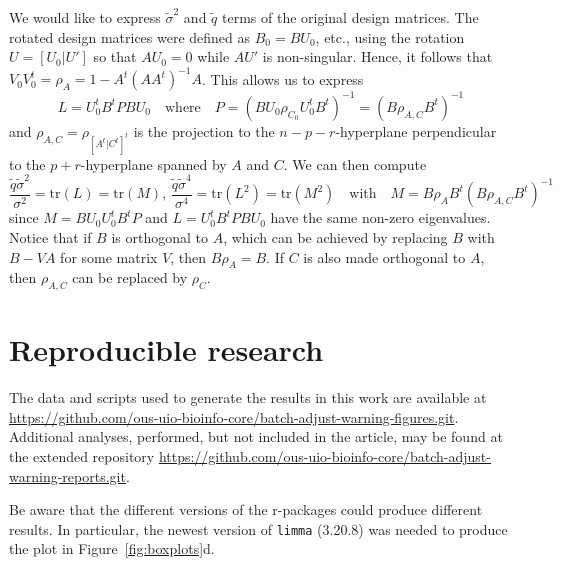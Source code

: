 \documentclass{bio}
\begin{document}
We would like to express $\tilde\sigma^2$ and $\tilde q$ terms of the original design matrices. The rotated design matrices were defined as $B_0=BU_0$, etc., using the rotation $U=[U_0|U']$ so that $AU_0=0$ while $AU'$ is non-singular. Hence, it follows that $V_0V_0^t=\rho_A=1-A^t(AA^t)^{-1}A$. This allows us to express
\begin{equation}
L=U_0^tB^tPBU_0
\quad\text{where}\quad
P=(BU_0\rho_{C_0}U_0^tB^t)^{-1}=(B\rho_{A,C}B^t)^{-1}
\end{equation}
and $\rho_{A,C}=\rho_{[A^t|C^t]^t}$ is the projection to the $n-p-r$-hyperplane perpendicular to the $p+r$-hyperplane spanned by $A$ and $C$. We can then compute
\begin{equation}
\frac{\tilde q\tilde\sigma^2}{\sigma^2}=\text{tr}(L)=\text{tr}(M),\,
\frac{\tilde q\tilde\sigma^4}{\sigma^4}=\text{tr}(L^2)=\text{tr}(M^2)
\quad\text{with}\quad
M=B\rho_A B^t(B\rho_{A,C}B^t)^{-1}
\end{equation}
since $M=BU_0U_0^tB^tP$ and $L=U_0^tB^tPBU_0$ have the same non-zero eigenvalues.
Notice that if $B$ is orthogonal to $A$, which can be achieved by replacing $B$ with $B-VA$ for some matrix $V$, then $B\rho_A=B$. If $C$ is also made orthogonal to $A$, then $\rho_{A,C}$ can be replaced by $\rho_C$.





\section*{Reproducible research}

The data and scripts used to generate the results in this work are available at
\href{https://github.com/ous-uio-bioinfo-core/batch-adjust-warning-figures.git}{https://github.com/ous-uio-bioinfo-core/batch-adjust-warning-figures.git}.
Additional analyses, performed, but not included in the article, may be found at the extended repository 
\href{https://github.com/ous-uio-bioinfo-core/batch-adjust-warning-reports.git}{https://github.com/ous-uio-bioinfo-core/batch-adjust-warning-reports.git}.

Be aware that the different versions of the r-packages could produce different results. In particular, the newest version of \texttt{limma} (3.20.8) was needed to produce the plot in Figure~\ref{fig:boxplots}d.
\end{document}
